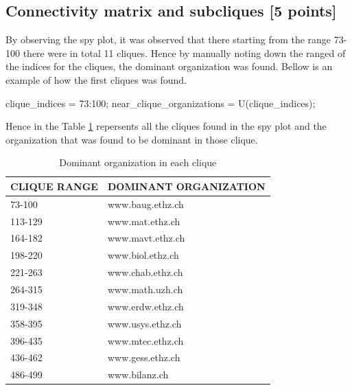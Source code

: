 \documentclass[unicode,11pt,a4paper,oneside,numbers=endperiod,openany]{scrartcl}
\begin{document}
\subsection{Connectivity matrix and subcliques [5 points]}
By observing the spy plot, it was observed that there starting from the range 73-100 there were in total 11 cliques. Hence by manually noting down the ranged of the indices for the cliques, the dominant organization was found. Bellow is an example of how the first cliques was found. \\

\begin{mcode}
    clique_indices = 73:100;
    near_clique_organizations = U(clique_indices);
\end{mcode}


Hence in the Table \ref{tab:dominant-org} repersents all the cliques found in the spy plot and the organization that was found to be dominant in those clique. \\

\noindent
\begin{table}[H]
    \centering
    \begin{tabular}{|l|l|}
        \hline
        CLIQUE RANGE & DOMINANT ORGANIZATION \\
        \hline
        73-100       & www.baug.ethz.ch      \\
        113-129      & www.mat.ethz.ch       \\
        164-182      & www.mavt.ethz.ch      \\
        198-220      & www.biol.ethz.ch      \\
        221-263      & www.chab.ethz.ch      \\
        264-315      & www.math.uzh.ch       \\
        319-348      & www.erdw.ethz.ch      \\
        358-395      & www.usys.ethz.ch      \\
        396-435      & www.mtec.ethz.ch      \\
        436-462      & www.gess.ethz.ch      \\
        486-499      & www.bilanz.ch         \\
        \hline
    \end{tabular}
    \caption{Dominant organization in each clique}
    \label{tab:dominant-org}
\end{table}
\end{document}
